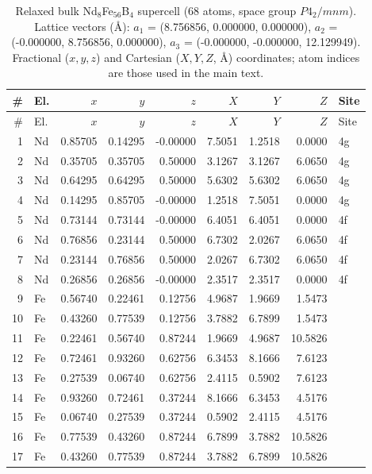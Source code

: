 \begin{longtable}{rlrrrrrrl}
\caption{Relaxed bulk Nd$_8$Fe$_{56}$B$_4$ supercell (68 atoms, space group $P4_2/mnm$). Lattice vectors (\AA): $a_1$ = (8.756856, 0.000000, 0.000000), $a_2$ = (-0.000000, 8.756856, 0.000000), $a_3$ = (-0.000000, -0.000000, 12.129949). Fractional ($x,y,z$) and Cartesian ($X,Y,Z$, \AA) coordinates; atom indices are those used in the main text.}\label{tab:S1}\\
\toprule
\# & El. & $x$ & $y$ & $z$ & $X$ & $Y$ & $Z$ & Site \\
\midrule
\endfirsthead
\toprule
\# & El. & $x$ & $y$ & $z$ & $X$ & $Y$ & $Z$ & Site \\
\midrule
\endhead
1 & Nd & 0.85705 & 0.14295 & -0.00000 & 7.5051 & 1.2518 & 0.0000 & 4g \\
2 & Nd & 0.35705 & 0.35705 & 0.50000 & 3.1267 & 3.1267 & 6.0650 & 4g \\
3 & Nd & 0.64295 & 0.64295 & 0.50000 & 5.6302 & 5.6302 & 6.0650 & 4g \\
4 & Nd & 0.14295 & 0.85705 & -0.00000 & 1.2518 & 7.5051 & 0.0000 & 4g \\
5 & Nd & 0.73144 & 0.73144 & -0.00000 & 6.4051 & 6.4051 & 0.0000 & 4f \\
6 & Nd & 0.76856 & 0.23144 & 0.50000 & 6.7302 & 2.0267 & 6.0650 & 4f \\
7 & Nd & 0.23144 & 0.76856 & 0.50000 & 2.0267 & 6.7302 & 6.0650 & 4f \\
8 & Nd & 0.26856 & 0.26856 & -0.00000 & 2.3517 & 2.3517 & 0.0000 & 4f \\
9 & Fe & 0.56740 & 0.22461 & 0.12756 & 4.9687 & 1.9669 & 1.5473 &  \\
10 & Fe & 0.43260 & 0.77539 & 0.12756 & 3.7882 & 6.7899 & 1.5473 &  \\
11 & Fe & 0.22461 & 0.56740 & 0.87244 & 1.9669 & 4.9687 & 10.5826 &  \\
12 & Fe & 0.72461 & 0.93260 & 0.62756 & 6.3453 & 8.1666 & 7.6123 &  \\
13 & Fe & 0.27539 & 0.06740 & 0.62756 & 2.4115 & 0.5902 & 7.6123 &  \\
14 & Fe & 0.93260 & 0.72461 & 0.37244 & 8.1666 & 6.3453 & 4.5176 &  \\
15 & Fe & 0.06740 & 0.27539 & 0.37244 & 0.5902 & 2.4115 & 4.5176 &  \\
16 & Fe & 0.77539 & 0.43260 & 0.87244 & 6.7899 & 3.7882 & 10.5826 &  \\
17 & Fe & 0.43260 & 0.77539 & 0.87244 & 3.7882 & 6.7899 & 10.5826 &  \\

\end{longtable}
